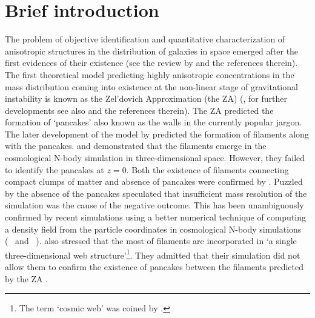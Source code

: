 \section{Brief introduction} \label{sec:3intro}



The problem of objective identification and quantitative characterization of anisotropic structures 
in the distribution of galaxies in space emerged after the first evidences of their existence
(see the review by \citealt{Oort1983} and the references therein). The first theoretical model predicting highly anisotropic concentrations in the mass distribution coming into existence at the non-linear stage of gravitational instability is known as the Zel'dovich Approximation (the ZA) (\citealt{Zeldovich1970}, for further developments see also \citealt{Shandarin1989} and the references therein). The ZA predicted the formation of  `pancakes'  also known as the walls in the currently popular jargon. The later development
of the model by \citet{Arnold1982} predicted the formation of filaments along with the pancakes. \citet{Klypin1983a} and \citet{Shandarin1984} demonstrated that the filaments emerge in the cosmological N-body simulation in three-dimensional space.
However, they failed to identify the pancakes at $z=0$. Both the existence of filaments connecting compact clumps of matter and absence of pancakes were confirmed by \citet{Frenk1983}. Puzzled by the absence of the pancakes \citet{Klypin1983a}
speculated that insufficient mass resolution of the simulation was the cause  of the negative outcome. 
This has been unambiguously confirmed by recent simulations using a better numerical technique of computing a density field from the particle
coordinates in cosmological N-body simulations (~\citealt{Shandarin2012} and ~\citealt{Abel2012}). \citealt{Klypin1983a} 
also stressed that the most of filaments are  incorporated in 
`a single three-dimensional web structure'\footnote{The term `cosmic web' was coined by  \citet{Bond1996}.}. 
They admitted that
their simulation did not allow them to confirm the existence of pancakes between the filaments predicted by the ZA \citep{Arnold1982}.

